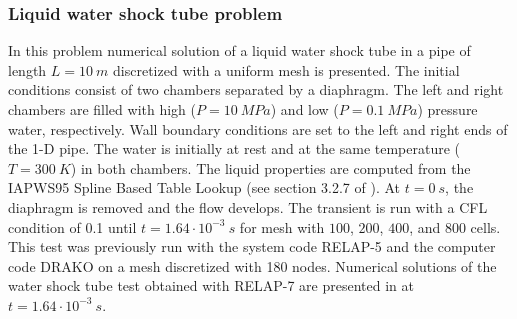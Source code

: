\documentclass{inputs/mc2015}
\begin{document}
\subsubsection{Liquid water shock tube problem} \label{sec:liq-water-1-phase-shock-tube}
%
In this problem numerical solution of a liquid water shock tube in a pipe of length $L = 10 \ m$ discretized with a uniform mesh is presented. The initial conditions consist of two chambers separated by a diaphragm. The left and right chambers are filled with high ($P=10\ MPa$) and low ($P=0.1\ MPa$) pressure water, respectively. Wall boundary conditions are set to the left and right ends of the 1-D pipe. The water is initially at rest and at the same temperature ($T=300\ K$) in both chambers. The liquid properties are computed from the IAPWS95 Spline Based Table Lookup (see section 3.2.7 of \cite{Berry_Peterson_2014}). At $t=0\ s$, the diaphragm is removed and the flow develops. The transient is run with a CFL condition of 0.1 until $t=1.64 \cdot 10^{-3} \ s$ for mesh with $100$, $200$, $400$, and $800$ cells. This test was previously run with the system code RELAP-5 and the computer code DRAKO \cite{drako} on a mesh discretized with 180 nodes. 
Numerical solutions of the water shock tube test obtained with RELAP-7 are presented in  at $t=1.64 \cdot 10^{-3} \ s$.
%
\end{document}
